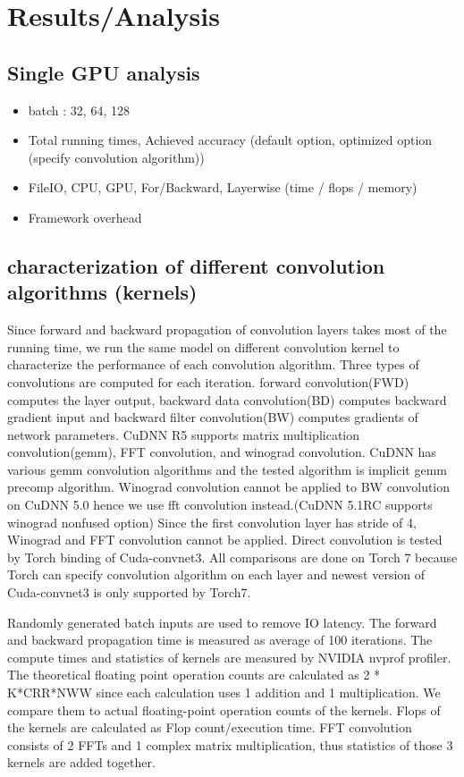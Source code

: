 \documentclass[conference]{IEEEtran}
\begin{document}
\section{Results/Analysis}

\subsection{Single GPU analysis}

\begin{itemize}
  \item batch : 32, 64, 128
  \item Total running times, Achieved accuracy (default option, optimized option (specify convolution algorithm))
  \item FileIO, CPU, GPU, For/Backward, Layerwise (time / flops / memory)
  \item Framework overhead
\end{itemize}

\subsection{characterization of different convolution algorithms (kernels)}
Since forward and backward propagation of convolution layers takes most of the running time, we run the same model on different convolution kernel to characterize the performance of each convolution algorithm.
Three types of convolutions are computed for each iteration.
forward convolution(FWD) computes the layer output, backward data convolution(BD) computes backward gradient input and backward filter convolution(BW) computes gradients of network parameters.
CuDNN R5 supports matrix multiplication convolution(gemm), FFT convolution, and winograd convolution.
CuDNN has various gemm convolution algorithms and the tested algorithm is implicit gemm precomp algorithm.
Winograd convolution cannot be applied to BW convolution on CuDNN 5.0 hence we use fft convolution instead.(CuDNN 5.1RC supports winograd nonfused option)
Since the first convolution layer has stride of 4, Winograd and FFT convolution cannot be applied.
Direct convolution is tested by Torch binding of Cuda-convnet3.
All comparisons are done on Torch 7 because Torch can specify convolution algorithm on each layer and newest version of Cuda-convnet3 is only supported by Torch7.

Randomly generated batch inputs are used to remove IO latency.
The forward and backward propagation time is measured as average of 100 iterations.
The compute times and statistics of kernels are measured by NVIDIA nvprof profiler.
The theoretical floating point operation counts are calculated as 2 * K*CRR*NWW since each calculation uses 1 addition and 1 multiplication.
We compare them to actual floating-point operation counts of the kernels.
Flops of the kernels are calculated as Flop count/execution time.
FFT convolution consists of 2 FFTs and 1 complex matrix multiplication, thus statistics of those 3 kernels are added together.
\end{document}
